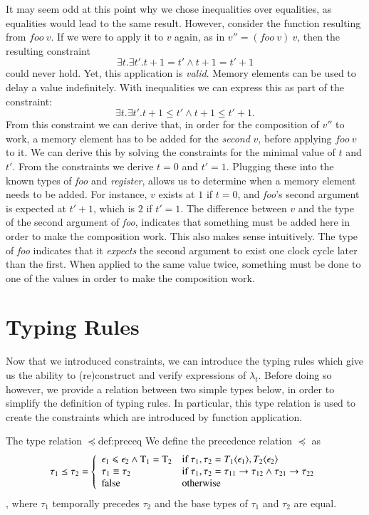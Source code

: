 It may seem odd at this point why we chose inequalities over equalities, as equalities would lead to the same result.
However, consider the function resulting from $\textit{foo} \: v$.
If we were to apply it to $v$ again, as in $v'' = (\textit{foo} \: v) \: v$, then the resulting constraint \[\exists t. \exists t'. t + 1 = t' \land t + 1 = t' + 1\] could never hold.
Yet, this application is \textit{valid}.
Memory elements can be used to delay a value indefinitely.
With inequalities we can express this as part of the constraint: \[ \exists t. \exists t'. t+1 \leq t' \land t+1 \leq t'+1.\]
From this constraint we can derive that, in order for the composition of $v''$ to work, a memory element has to be added for the \textit{second} $v$, before applying $\textit{foo} \: v$ to it.
We can derive this by solving the constraints for the minimal value of $t$ and $t'$.
From the constraints we derive $t = 0$ and $t' = 1$.
Plugging these into the known types of \textit{foo} and \textit{register}, allows us to determine when a memory element needs to be added.
For instance, $v$ exists at $1$ if $t=0$, and \textit{foo}'s second argument is expected at $t' + 1$, which is $2$ if $t' = 1$.
The difference between $v$ and the type of the second argument of \textit{foo}, indicates that something must be added here in order to make the composition work.
This also makes sense intuitively.
The type of \textit{foo} indicates that it \textit{expects} the second argument to exist one clock cycle later than the first.
When applied to the same value twice, something must be done to one of the values in order to make the composition work.

\section{Typing Rules}
Now that we introduced constraints, we can introduce the typing rules which give us the ability to (re)construct and verify expressions of $\lambda_t$.
Before doing so however, we provide a relation between two simple types below, in order to simplify the definition of typing rules.
In particular, this type relation is used to create the constraints which are introduced by function application.

\begin{definitiontitled}{The type relation $\preceq$}{def:preceq}
We define the precedence relation $\preceq$ as
\[\tau_1 \preceq \tau_2 = \left\{ 
  \begin{array}{l l}
      \epsilon_1 \leq \epsilon_2 \land \text{T}_1 = \text{T}_2
    & \text{if $\tau_1,\tau_2 = T_1 \langle \epsilon_1 \rangle, T_2 \langle \epsilon_2 \rangle$ }\\
      \tau_1 \equiv \tau_2
    & \text{if $\tau_1,\tau_2 = \tau_{11} \to \tau_{12} \land \tau_{21} \to \tau_{22}$}\\
      \text{false}
    & \text{otherwise}\\
  \end{array} \right.
\]
, where $\tau_1$ temporally precedes $\tau_2$ and the base types of $\tau_1$ and $\tau_2$ are equal.
\end{definitiontitled}

